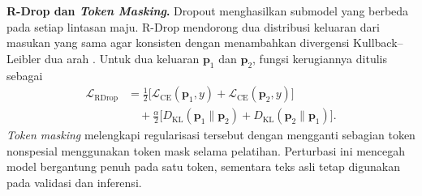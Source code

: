 \textbf{R-Drop dan \textit{Token Masking}.} Dropout menghasilkan submodel yang berbeda pada setiap lintasan maju. R-Drop mendorong dua distribusi keluaran dari masukan yang sama agar konsisten dengan menambahkan divergensi Kullback--Leibler dua arah \cite{liang21}. Untuk dua keluaran $\mathbf{p}_1$ dan $\mathbf{p}_2$, fungsi kerugiannya ditulis sebagai
\begin{equation}
\begin{aligned}
\mathcal{L}_{\mathrm{RDrop}}
&=\frac{1}{2}\bigl[\mathcal{L}_{\mathrm{CE}}(\mathbf{p}_1,y)
+\mathcal{L}_{\mathrm{CE}}(\mathbf{p}_2,y)\bigr]\\
&\quad+\frac{\alpha}{2}\bigl[D_{\mathrm{KL}}(\mathbf{p}_1\|\mathbf{p}_2)
+D_{\mathrm{KL}}(\mathbf{p}_2\|\mathbf{p}_1)\bigr].
\end{aligned}
\end{equation}
\textit{Token masking} melengkapi regularisasi tersebut dengan mengganti sebagian token nonspesial menggunakan token mask selama pelatihan. Perturbasi ini mencegah model bergantung penuh pada satu token, sementara teks asli tetap digunakan pada validasi dan inferensi.
